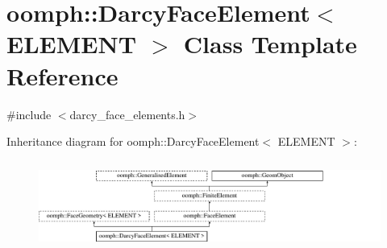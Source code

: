 \hypertarget{classoomph_1_1DarcyFaceElement}{}\section{oomph\+:\+:Darcy\+Face\+Element$<$ E\+L\+E\+M\+E\+NT $>$ Class Template Reference}
\label{classoomph_1_1DarcyFaceElement}


{\ttfamily \#include $<$darcy\+\_\+face\+\_\+elements.\+h$>$}

Inheritance diagram for oomph\+:\+:Darcy\+Face\+Element$<$ E\+L\+E\+M\+E\+NT $>$\+:\begin{figure}[H]
\begin{center}
\leavevmode
\includegraphics[height=2.951252cm]{classoomph_1_1DarcyFaceElement}
\end{center}
\end{figure}

